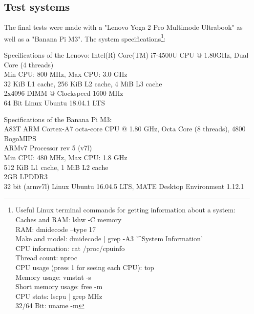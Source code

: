 \documentclass[11pt]{article}
\begin{document}
\subsection{Test systems}
The final tests were made with a "Lenovo Yoga 2 Pro Multimode Ultrabook" as well as a "Banana Pi M3". The system specifications\footnote{Useful Linux terminal commands for getting information about a system:\\
Caches and RAM: lshw -C memory\\
RAM: dmidecode --type 17\\
Make and model: dmidecode | grep -A3 '\^{}System Information'\\
CPU information: cat /proc/cpuinfo\\
Thread count: nproc\\
CPU usage (press 1 for seeing each CPU): top\\
Memory usage: vmstat -s\\
Short memory usage: free -m\\
CPU stats: lscpu | grep MHz\\
32/64 Bit: uname -m}:

Specifications of the Lenovo:
Intel(R) Core(TM) i7-4500U CPU @ 1.80GHz, Dual Core (4 threads)\\
Min CPU: 800 MHz, Max CPU: 3.0 GHz\\
32 KiB L1 cache, 256 KiB L2 cache, 4 MiB L3 cache\\
2x4096 DIMM @ Clockspeed 1600 MHz\\
64 Bit Linux Ubuntu 18.04.1 LTS

Specifications of the Banana Pi M3:\\
A83T ARM Cortex-A7 octa-core CPU @ 1.80 GHz, Octa Core (8 threads), 4800 BogoMIPS\\
ARMv7 Processor rev 5 (v7l)\\
Min CPU: 480 MHz, Max CPU: 1.8 GHz\\
512 KiB L1 cache, 1 MiB L2 cache\\
2GB LPDDR3\\
32 bit (armv7l) Linux Ubuntu 16.04.5 LTS, MATE Desktop Environment 1.12.1

\newpage
\end{document}
